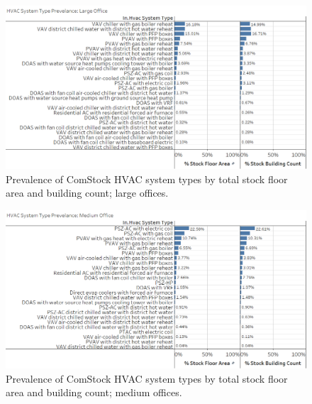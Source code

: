 \begin{figure}
    \centering \includegraphics[width=1.0\textwidth]{figures/HVAC_SYS_Type_PREV_LrgOffice.png}
    \caption[HVAC system type prevalence in large offices]{Prevalence of ComStock HVAC system types by total stock floor area and building count; large offices.}
    \label{fig:hvac_sys_type_prevalence_lrgoffice}
\end{figure}

\begin{figure}
    \centering \includegraphics[width=1.0\textwidth]{figures/HVAC_SYS_Type_PREV_MedOffice.png}
    \caption[HVAC system type prevalence in medium offices]{Prevalence of ComStock HVAC system types by total stock floor area and building count; medium offices.}
    \label{fig:hvac_sys_type_prevalence_medoffice}
\end{figure}

